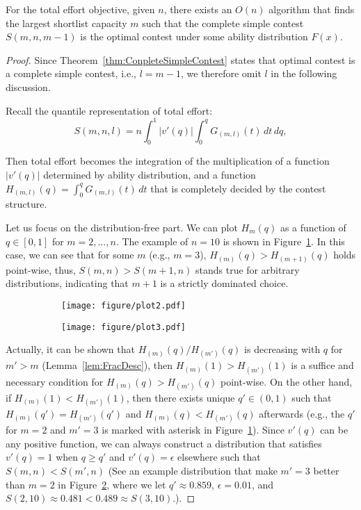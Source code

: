 \begin{proposition}\label{prop:SupM}
    For the total effort objective, given $n$, there exists an $O(n)$ algorithm that finds the largest shortlist capacity $m$ such that the complete simple contest $S(m,n,m-1)$ is the optimal contest under some ability distribution $F(x)$.    
\end{proposition}
\begin{proof}
    Since Theorem~\ref{thm:ConpleteSimpleContest} states that optimal contest is a complete simple contest, i.e., $l = m-1$, we therefore omit $l$ in the following discussion.

Recall the quantile representation of total effort:
\[
    S(m,n, l)= n\int_0^1|v'(q)|\int_0^qG_{(m,l)}(t)\,dt\,dq,
    \]

Then total effort becomes the integration of the multiplication of a function $|v'(q)|$ determined by ability distribution, and a function $H_{(m,l)}(q)=\int_0^qG_{(m,l)}(t)\,dt$ that is completely decided by the contest structure.


Let us focus on the distribution-free part. We can plot $H_{m}(q)$ as a function of $q\in[0,1]$ for $m = 2,\ldots,n$. The example of $n=10$ is shown in Figure~\ref{fig:universal-b}. In this case, we can see that for some $m$ (e.g., $m=3$), $H_{(m)}(q)>H_{(m+1)}(q)$ holds point-wise, thus, $S(m,n) > S(m+1,n)$ stands true for arbitrary distributions, indicating that $m+1$ is a strictly dominated choice. 

\begin{figure}[h]

\begin{subfigure}[ht]{0.48\textwidth}
    \centering
    \texttt{[image: figure/plot2.pdf]}
    \label{fig:universal-b}
    \end{subfigure}
\begin{subfigure}[ht]{0.48\textwidth}
    \centering
    \texttt{[image: figure/plot3.pdf]}
    \label{fig:universal-c}
    \end{subfigure}
\label{fig:universal}
\end{figure}

Actually, it can be shown that $H_{(m)}(q)/H_{(m')}(q)$ is decreasing with $q$ for $m'>m$ (Lemma~\ref{lem:FracDesc}), then $H_{(m)}(1) > H_{(m')}(1)$ is a suffice and necessary condition for $H_{(m)}(q)>H_{(m')}(q)$ point-wise. On the other hand, if $H_{(m)}(1) < H_{(m')}(1)$, then there exists unique $q' \in(0,1)$ such that $H_{(m)}(q')=H_{(m')}(q')$ and $H_{(m)}(q)<H_{(m')}(q)$ afterwards (e.g., the $q'$ for $m=2$ and $m'=3$ is marked with asterisk in Figure~\ref{fig:universal-b}). Since $v'(q)$ can be any positive function, we can always construct a distribution that satisfies $v'(q)=1$ when $q\geq q'$ and $v'(q)=\epsilon$ elsewhere such that $S(m,n) < S(m',n)$ (See an example distribution that make $m'=3$ better than $m=2$ in Figure~\ref{fig:universal-c}, where we let $q' \approx 0.859$, $\epsilon=0.01$, and $S(2,10) \approx 0.481 < 0.489 \approx S(3,10)$.).


\end{proof}
